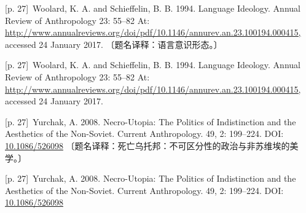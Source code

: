 \documentclass[10pt,a4paper]{article}
\begin{document}
\noindent\begin{minipage}{\textwidth}\begin{minipage}[t]{\dimexpr.5\textwidth-4mm\relax}\noindent\begin{minipage}[t]{\linewidth}{\scriptsize\color{gray} [p. 27]}\ Woolard, K. A. and Schieffelin, B. B. 1994. Language Ideology. Annual Review of Anthropology 23: 55–82 At: \url{http://www.annualreviews.org/doi/pdf/10.1146/annurev.an.23.100194.000415,} accessed 24 January 2017. 〔题名译释：语言意识形态。〕\par\end{minipage}\par\end{minipage}\hfill\begin{minipage}[t]{\dimexpr.5\textwidth-4mm\relax}\noindent\begin{minipage}[t]{\linewidth}{\scriptsize\color{gray} [p. 27]}\ Woolard, K. A. and Schieffelin, B. B. 1994. Language Ideology. Annual Review of Anthropology 23: 55–82 At: \url{http://www.annualreviews.org/doi/pdf/10.1146/annurev.an.23.100194.000415,} accessed 24 January 2017.\par\end{minipage}\par\end{minipage}\end{minipage}\par
\noindent\begin{minipage}{\textwidth}\begin{minipage}[t]{\dimexpr.5\textwidth-4mm\relax}\noindent\begin{minipage}[t]{\linewidth}{\scriptsize\color{gray} [p. 27]}\ Yurchak, A. 2008. Necro-Utopia: The Politics of Indistinction and the Aesthetics of the Non-Soviet. Current Anthropology. 49, 2: 199–224. DOI: \url{10.1086/526098} 〔题名译释：死亡乌托邦：不可区分性的政治与非苏维埃的美学。〕\par\end{minipage}\par\end{minipage}\hfill\begin{minipage}[t]{\dimexpr.5\textwidth-4mm\relax}\noindent\begin{minipage}[t]{\linewidth}{\scriptsize\color{gray} [p. 27]}\ Yurchak, A. 2008. Necro-Utopia: The Politics of Indistinction and the Aesthetics of the Non-Soviet. Current Anthropology. 49, 2: 199–224. DOI: \url{10.1086/526098}\par\end{minipage}\par\end{minipage}\end{minipage}\par
\end{document}
